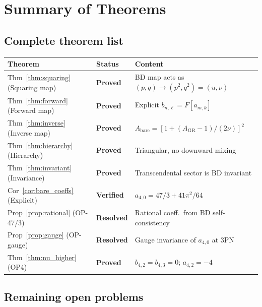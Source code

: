 \documentclass[11pt,a4paper]{article}
\theoremstyle{plain}
\theoremstyle{definition}
\theoremstyle{remark}
\newcommand{\GR}{\mathrm{GR}}
\newcommand{\bare}{\mathrm{bare}}
\begin{document}
\section{Summary of Theorems}
\label{sec:summary}

\subsection{Complete theorem list}

\begin{center}
\renewcommand{\arraystretch}{1.45}
\begin{tabular}{p{4cm}lp{6cm}}
\toprule
Theorem & Status & Content \\
\midrule
Thm~\ref{thm:squaring} (Squaring map) & \textbf{Proved} & BD map acts as $(p,q)\to(p^2,q^2)=(u,\nu)$ \\
Thm~\ref{thm:forward} (Forward map) & \textbf{Proved} & Explicit $b_{n,\ell} = F[a_{m,k}]$ \\
Thm~\ref{thm:inverse} (Inverse map) & \textbf{Proved} & $A_\bare = [1+(A_\GR-1)/(2\nu)]^2$ \\
Thm~\ref{thm:hierarchy} (Hierarchy) & \textbf{Proved} & Triangular, no downward mixing \\
Thm~\ref{thm:invariant} (Invariance) & \textbf{Proved} & Transcendental sector is BD invariant \\
Cor~\ref{cor:bare_coeffs} (Explicit) & \textbf{Verified} & $a_{4,0} = 47/3 + 41\pi^2/64$ \\
Prop~\ref{prop:rational} (OP-47/3) & \textbf{Resolved} & Rational coeff.\ from BD self-consistency \\
Prop~\ref{prop:gauge} (OP-gauge) & \textbf{Resolved} & Gauge invariance of $a_{4,0}$ at 3PN \\
Thm~\ref{thm:nu_higher} (OP4) & \textbf{Proved} & $b_{4,2}=b_{4,3}=0$; $a_{4,2}=-4$ \\
\bottomrule
\end{tabular}
\end{center}

\subsection{Remaining open problems}
\end{document}
